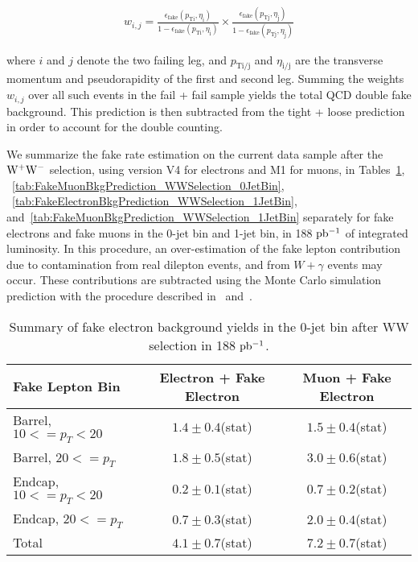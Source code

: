 \begin{eqnarray}
  w_{i,j} = \frac{\epsilon_{\mathrm{fake}}(p_{\mathrm{T i}},\eta_{\mathrm{i}})}{1 - \epsilon_{\mathrm{fake}}(p_{\mathrm{T i}},\eta_{\mathrm{i}})} \times \frac{\epsilon_{\mathrm{fake}}(p_{\mathrm{T j}},\eta_{\mathrm{j}})}{1 - \epsilon_{\mathrm{fake}}(p_{\mathrm{T j}},\eta_{\mathrm{j}})}
\end{eqnarray}

where $i$ and $j$ denote the two failing leg, and $p_{\mathrm{T i/j}}$ and $\eta_{\mathrm{i/j}}$
are the transverse momentum and pseudorapidity of the first and second leg.
Summing the weights $w_{i,j}$ over all such events in the fail + fail sample yields
the total QCD double fake background. This prediction is then subtracted from the
tight + loose prediction in order to account for the double counting. 

We summarize the fake rate estimation on the current data sample after the $\mathrm{W}^+\mathrm{W}^-$ selection, 
using version V4 for electrons and M1 for muons, in 
Tables~\ref{tab:FakeElectronBkgPrediction_WWSelection_0JetBin},
~\ref{tab:FakeMuonBkgPrediction_WWSelection_0JetBin},
~\ref{tab:FakeElectronBkgPrediction_WWSelection_1JetBin}, 
and~\ref{tab:FakeMuonBkgPrediction_WWSelection_1JetBin} separately for fake electrons and fake muons in the
0-jet bin and 1-jet bin, in 188 $\mathrm{pb^{-1}}$ of integrated luminosity. In this procedure, an over-estimation of the fake lepton contribution due to 
contamination from real dilepton events, and from $W+\gamma$ events may occur. These contributions 
are subtracted using the Monte Carlo simulation prediction with the procedure described 
in~\cite{fakeLeptonNote1} and~\cite{fakeLeptonBkgSpillage1}.

\begin{table}[!htbp]
\begin{center}
\begin{tabular}{|l|c|c|}
\hline
Fake Lepton Bin               & Electron + Fake Electron & Muon + Fake Electron  \\
\hline
Barrel, $10 <= p_{T} < 20$    &  $1.4 \pm 0.4$(stat)	 &   $1.5 \pm 0.4$(stat) \\
Barrel, $20 <= p_{T} $        &  $1.8 \pm 0.5$(stat)	 &   $3.0 \pm 0.6$(stat) \\
Endcap, $10 <= p_{T} < 20$    &  $0.2 \pm 0.1$(stat)	 &   $0.7 \pm 0.2$(stat) \\
Endcap, $20 <= p_{T} $        &  $0.7 \pm 0.3$(stat)	 &   $2.0 \pm 0.4$(stat) \\
\hline
Total                         &  $4.1 \pm 0.7$(stat)     &   $7.2 \pm 0.7$(stat) \\
\hline
\end{tabular}
\caption{Summary of fake electron background yields in the 0-jet bin after WW selection in 188 $\mathrm{pb^{-1}}$.}
\label{tab:FakeElectronBkgPrediction_WWSelection_0JetBin}
\end{center}
\end{table}

